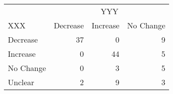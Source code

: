 \begin{table}[!h]
\centering
\begin{tabular}{lrrr}
\toprule
\multicolumn{1}{c}{ } & \multicolumn{3}{c}{YYY} \\
\cmidrule(l{3pt}r{3pt}){2-4}
XXX & Decrease & Increase & No Change\\
\midrule
Decrease & 37 & 0 & 9\\
Increase & 0 & 44 & 5\\
No Change & 0 & 3 & 5\\
Unclear & 2 & 9 & 3\\
\bottomrule
\end{tabular}
\end{table}
